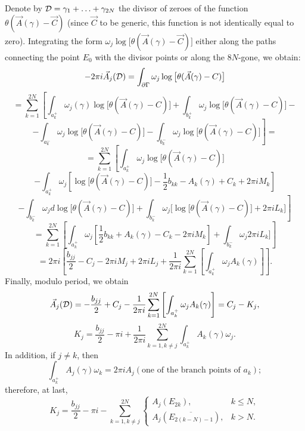 \documentclass[12pt]{article}
\newcommand{\DD}{{\cal D}}
\begin{document}
Denote by $\DD=\gamma_1+\ldots+\gamma_{2N}$ the divisor of zeroes of the function $\theta(\vec A(\gamma)-\vec C)$ (since $\vec C$ to be generic, this function is not  identically equal to zero). Integrating the form  $\omega_j \log\big[\theta(\vec A(\gamma)-\vec C) \big]$ either along the paths connecting the point $E_0$ with the divisor points or along the $8N$-gone, we obtain:
$$
-2\pi i \vec A_j(\DD) = \int_{\partial\Gamma} \omega_j \log\big[\theta(\vec A(\gamma)-C) \big]
$$
$$
=\sum_{k=1}^{2N} \left[\int_{a^+_k}\omega_j(\gamma)\log\big[\theta(\vec A(\gamma)-C) \big]+
\int_{b^+_k} \omega_j \log\big[\theta(\vec A(\gamma)-C) \big]-\right.
$$
$$
\left. -\int_{a^-_k} \omega_j \log\big[\theta(\vec A(\gamma)-C) \big]-
\int_{b^-_k} \omega_j \log\big[\theta(\vec A(\gamma)-C) \big]\right]=
$$
$$
=\sum_{k=1}^{2N} \left[\int_{a^+_k} \omega_j \log\big[\theta(\vec A(\gamma)-C) \big]  \right.
$$
$$
-\int_{a^+_k} \omega_j \left[\log\big[\theta(\vec A(\gamma)-C) \big]  -\frac{1}{2} b_{kk}- A_k(\gamma) +  C_k + 2\pi i M_k \right]  
$$
$$
\left. -\int_{b^-_k} \omega_jd\log\big[\theta(\vec A(\gamma)-C) \big]  + 
\int_{b^-_k} \omega_j \big[\log\big[\theta(\vec A(\gamma)-C) \big]+2\pi i L_k  \big]  \right]  
$$
$$
=\sum_{k=1}^{2N} \left[\int_{a^+_k} \omega_j \left[\frac{1}{2} b_{kk}+ A_k(\gamma) - C_k - 2\pi i M_k \right] +
\int_{b^-_k} \omega_j 2\pi i L_k  \big]\right]   
$$
$$
=2\pi i \left[ \frac{b_{jj}}{2}- C_j - 2\pi i M_j +2 \pi i L_j + \frac{1}{2\pi i}\sum_{k=1}^{2N} \left[\int_{a^+_k} \omega_j A_k(\gamma) \right]  \right].
$$
Finally, modulo period, we obtain
$$
\vec A_j(\DD) =  -\frac{b_{jj}}{2} + C_j  -\frac{1}{2\pi i} \sum_{k=1}^{2N} \left[\int_{a^+_k} \omega_j A_k(\gamma) \right] = C_j- K_j,
$$
\begin{equation}
\label{eq:riemann_const2}
K_j = \frac{b_{jj}}{2} - \pi i + \frac{1}{2\pi i}\sum_{ k=1, k\ne j }^{2N} \int_{a^+_k} A_k(\gamma) \omega_j .
\end{equation}
In addition, if $j\ne k$, then
$$
\int_{a^+_k} A_j(\gamma) \omega_k = 2\pi i A_j(\mbox{one of the branch points of } a_k);
$$
therefore, at last,
\begin{equation}
\label{eq:riemann_const3}
K_j = \frac{b_{jj}}{2} -\pi i - \sum_{ k=1, k\ne j }^{2N} \left\{\begin{array}{ll} A_j(E_{2k}), & k\le N, \\
 A_j(\overline{E_{2(k-N)-1}} ), & k > N.  \end{array} \right.
\end{equation}
\end{document}
